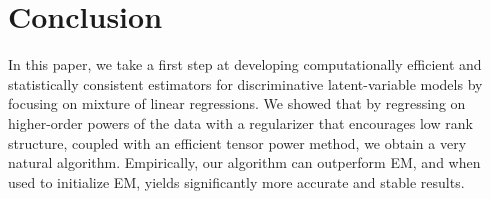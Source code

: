 \section{Conclusion}
\label{sec:conclusion}

In this paper, we take a first step at developing computationally efficient and
statistically consistent estimators for discriminative latent-variable models
by focusing on mixture of linear regressions. We showed that by regressing on
higher-order powers of the data with a regularizer that encourages low rank
structure, coupled with an efficient tensor power method, we obtain a very natural algorithm.
Empirically, our algorithm can outperform EM, and when used to initialize EM,
yields significantly more accurate and stable results.
